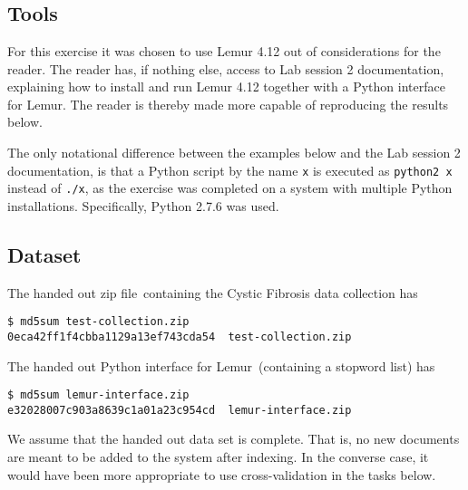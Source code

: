 
\section{}

\subsection*{Tools}

For this exercise it was chosen to use Lemur 4.12 out of considerations for the
reader. The reader has, if nothing else, access to Lab session 2 documentation,
explaining how to install and run Lemur 4.12 together with a Python interface
for Lemur. The reader is thereby made more capable of reproducing the results
below.

The only notational difference between the examples below and the Lab session 2
documentation, is that a Python script by the name \lstinline$x$ is executed as
\lstinline$python2 x$ instead of \lstinline$./x$, as the exercise was completed
on a system with multiple Python installations. Specifically, Python 2.7.6 was
used.

\subsection*{Dataset}

The handed out zip file\footnotemark~containing the Cystic Fibrosis data
collection has


\begin{lstlisting}
$ md5sum test-collection.zip 
0eca42ff1f4cbba1129a13ef743cda54  test-collection.zip
\end{lstlisting}

The handed out Python interface for Lemur\footnotemark~(containing a stopword
list) has


\begin{lstlisting}
$ md5sum lemur-interface.zip 
e32028007c903a8639c1a01a23c954cd  lemur-interface.zip
\end{lstlisting}

We assume that the handed out data set is complete. That is, no new documents
are meant to be added to the system after indexing. In the converse case, it
would have been more appropriate to use cross-validation in the tasks below.

